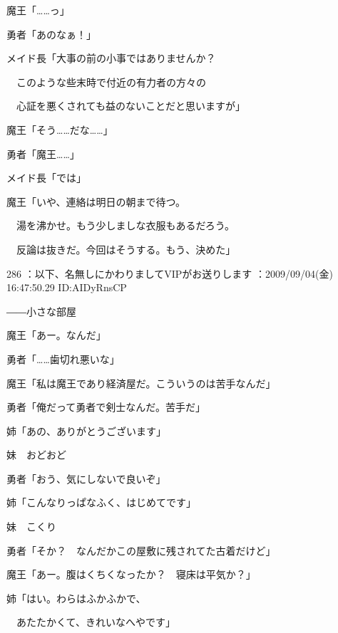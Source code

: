 \documentclass[a4j,twocolumn]{tarticle}
\begin{document}
魔王「……っ」\par{} 
勇者「あのなぁ！」 



メイド長「大事の前の小事ではありませんか？\par{} 
　このような些末時で付近の有力者の方々の\par{} 
　心証を悪くされても益のないことだと思いますが」 



魔王「そう……だな……」\par{} 
勇者「魔王……」 



メイド長「では」\par{} 
魔王「いや、連絡は明日の朝まで待つ。\par{} 
　湯を沸かせ。もう少しましな衣服もあるだろう。\par{} 
　反論は抜きだ。今回はそうする。もう、決めた」 

	
    
    

286 ：以下、名無しにかわりましてVIPがお送りします ：2009/09/04(金) 16:47:50.29 ID:AIDyRnsCP 


――小さな部屋 



魔王「あー。なんだ」\par{} 
勇者「……歯切れ悪いな」 



魔王「私は魔王であり経済屋だ。こういうのは苦手なんだ」\par{} 
勇者「俺だって勇者で剣士なんだ。苦手だ」 



姉「あの、ありがとうございます」\par{} 
妹　おどおど 



勇者「おう、気にしないで良いぞ」 



姉「こんなりっぱなふく、はじめてです」\par{} 
妹　こくり 



勇者「そか？　なんだかこの屋敷に残されてた古着だけど」\par{} 
魔王「あー。腹はくちくなったか？　寝床は平気か？」 



姉「はい。わらはふかふかで、\par{} 
　あたたかくて、きれいなへやです」 
\end{document}
